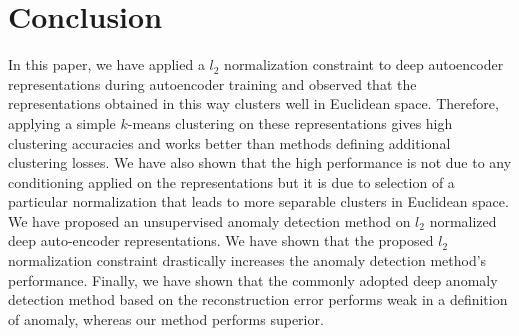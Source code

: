 \documentclass[conference]{IEEEtran}
\begin{document}




\section{Conclusion}
In this paper, we have applied a $l_2$ normalization constraint to deep autoencoder representations during autoencoder training and observed that the representations obtained in this way clusters well in Euclidean space.
Therefore, applying a simple $k$-means clustering on these representations gives high clustering accuracies and works better than methods defining additional clustering losses.
We have also shown that the high performance is not due to any conditioning applied on the representations but it is due to selection of a particular normalization that leads to more separable clusters in Euclidean space.
We have proposed an unsupervised anomaly detection method on $l_2$ normalized deep auto-encoder representations.
We have shown that the proposed $l_2$ normalization constraint drastically increases the anomaly detection method's performance. 
Finally, we have shown that the commonly adopted deep anomaly detection method based on the reconstruction error performs weak in a definition of anomaly, whereas our method performs superior.














\end{document}
